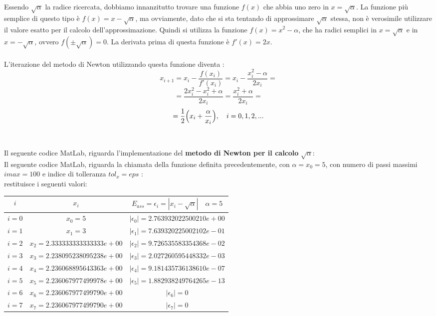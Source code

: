Essendo $\sqrt{\alpha}$ la radice ricercata, dobbiamo innanzitutto trovare una funzione $f(x)$ che abbia uno zero in $x=\sqrt{\alpha}$. La funzione più semplice di questo tipo è $f(x)=x-\sqrt{\alpha}$, ma ovviamente, dato che si sta tentando di approssimare $\sqrt{\alpha}$ stessa, non è verosimile utilizzare il valore esatto per il calcolo dell'approssimazione. Quindi si
utilizza la funzione $f(x) = x^2-\alpha$, che ha radici semplici in $x=\sqrt{\alpha}$ e in $x=-\sqrt{\alpha}$, ovvero $f(\pm\sqrt{\alpha})=0$. La derivata prima di questa funzione è $f'(x)=2x$.\\\\
L'iterazione del metodo di Newton utilizzando questa funzione diventa :
	\[
	x_{i+1} = x_i-\frac{f(x_i)}{f'(x_i)} = x_i - \frac{x_i^2-\alpha}{2x_i} =
	\]
	\[
	= \frac{2x_i^2-x_i^2+\alpha}{2x_i} = \frac{x_i^2+\alpha}{2x_i} =
	\]
	\[
	= \frac{1}{2} \Bigl( x_i+\frac{\alpha}{x_i} \Bigl),\quad i=0,1,2,...
	\]\\\\
Il seguente codice MatLab, riguarda l'implementazione del \textbf{metodo di Newton per il calcolo} $\sqrt{\alpha}$:\\ 
	
Il seguente codice MatLab, riguarda la chiamata della funzione definita precedentemente, con $\alpha=x_0=5$, con numero di passi massimi $imax=100$ e indice di tolleranza $tol_x=eps$ :\\
	
restituisce i seguenti valori:\\
\begin{center}
	\begin{tabular}{|c|c|c|}
		\hline
			$i$ & $x_i$ & $E_{ass}=\epsilon_i=|x_i-\sqrt{\alpha}| \quad \alpha=5$ \\
		\hline
    		$i=0$ & $x_0 = 5$ & $|\epsilon_0| = 2.763932022500210e+00$\\
    		$i=1$ & $x_1 = 3$ & $|\epsilon_1| = 7.639320225002102e-01$\\
    		$i=2$ & $x_2 = 2.333333333333333e+00$ & $|\epsilon_2| = 9.726535583354368e-02$\\
    		$i=3$ & $x_3 = 2.238095238095238e+00$ & $|\epsilon_3| = 2.027260595448332e-03$\\
    		$i=4$ & $x_4 = 2.236068895643363e+00$ & $|\epsilon_4| = 9.181435736138610e-07$\\
    		$i=5$ & $x_5 = 2.236067977499978e+00$ & $|\epsilon_5| = 1.882938249764265e-13$\\
    		$i=6$ & $x_6 = 2.236067977499790e+00$ & $|\epsilon_6| = 0$\\
    		$i=7$ & $x_7 = 2.236067977499790e+00$ & $|\epsilon_7| = 0$\\
		\hline
	\end{tabular}
\end{center}
